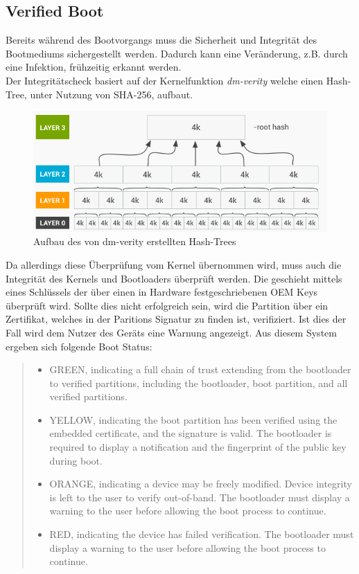 	\subsection{Verified Boot}
	Bereits während des Bootvorgangs muss die Sicherheit und Integrität des Bootmediums sichergestellt werden. Dadurch kann eine Veränderung, z.B. durch eine Infektion, frühzeitig erkannt werden.\\
	Der Integritätscheck basiert auf der Kernelfunktion \textit{dm-verity} welche einen Hash-Tree, unter Nutzung von SHA-256, aufbaut.
	\begin{figure}[h]
	\centering
	\includegraphics[width=0.7\linewidth]{android_pages/graphics/dm-verity-table}
	\caption[Aufbau des Hash-Trees]{Aufbau des von dm-verity erstellten Hash-Trees\protect\cite{VerifiedBoot}}
	\label{fig:dm-verity-table}
	\end{figure}
	Da allerdings diese Überprüfung vom Kernel übernommen wird, muss auch die Integrität des Kernels und Bootloaders überprüft werden. Die geschieht mittels eines Schlüssels der über einen in Hardware festgeschriebenen OEM Keys überprüft wird. Sollte dies nicht erfolgreich sein, wird die Partition über ein Zertifikat, welches in der Paritions Signatur zu finden ist, verifiziert. Ist dies der Fall wird dem Nutzer des Geräts eine Warnung angezeigt. Aus diesem System ergeben sich folgende Boot Status:\\
	\begin{quote}
		\begin{itemize}\itemsep0pt
			\item GREEN, indicating a full chain of trust extending from the bootloader to verified partitions, including the bootloader, boot partition, and all verified partitions. 
			\item YELLOW, indicating the boot partition has been verified using the embedded certificate, and the signature is valid. The bootloader is required to display a notification and the fingerprint of the public key during boot.
			\item ORANGE, indicating a device may be freely modified. Device integrity is left to the user to verify out-of-band. The bootloader must display a warning to the user before allowing the boot process to continue. 
			\item RED, indicating the device has failed verification. The bootloader must display a warning to the user before allowing the boot process to continue. 
		\end{itemize}
		\cite{VerifyingBoot}
	\end{quote}
